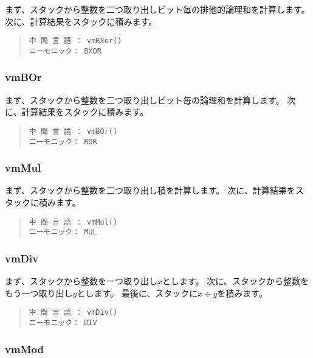 まず、スタックから整数を二つ取り出しビット毎の排他的論理和を計算します。
次に、計算結果をスタックに積みます。

\begin{quote}
\begin{verbatim}
中 間 言 語 ： vmBXor()
ニーモニック： BXOR
\end{verbatim}
\end{quote}

\subsubsection{vmBOr}

まず、スタックから整数を二つ取り出しビット毎の論理和を計算します。
次に、計算結果をスタックに積みます。

\begin{quote}
\begin{verbatim}
中 間 言 語 ： vmBOr()
ニーモニック： BOR
\end{verbatim}
\end{quote}

\subsubsection{vmMul}

まず、スタックから整数を二つ取り出し積を計算します。
次に、計算結果をスタックに積みます。

\begin{quote}
\begin{verbatim}
中 間 言 語 ： vmMul()
ニーモニック： MUL
\end{verbatim}
\end{quote}

\subsubsection{vmDiv}

まず、スタックから整数を一つ取り出し$x$とします。
次に、スタックから整数をもう一つ取り出し$y$とします。
最後に、スタックに$x \div y$を積みます。

\begin{quote}
\begin{verbatim}
中 間 言 語 ： vmDiv()
ニーモニック： DIV
\end{verbatim}
\end{quote}

\subsubsection{vmMod}

